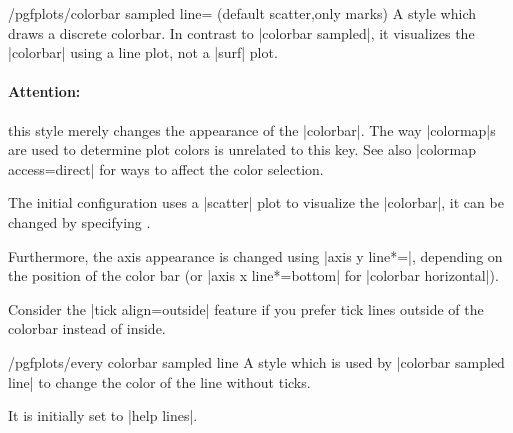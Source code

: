 \begin{stylekey}{/pgfplots/colorbar sampled line= (default scatter,only marks)}
    A style which draws a discrete colorbar. In contrast to |colorbar sampled|,
    it visualizes the |colorbar| using a line plot, not a |surf| plot.
\begin{codeexample}[]
\end{codeexample}

    \paragraph{Attention:}

    this style merely changes the appearance of the |colorbar|. The way
    |colormap|s are used to determine plot colors is unrelated to this key. See
    also |colormap access=direct| for ways to affect the color selection.

    The initial configuration uses a |scatter| plot to visualize the
    |colorbar|, it can be changed by specifying .

    Furthermore, the axis appearance is changed using
    |axis y line*=|, depending on the position of the color
    bar (or |axis x line*=bottom| for |colorbar horizontal|).

    Consider the |tick align=outside| feature if you prefer tick lines outside
    of the colorbar instead of inside.

    \begin{stylekey}{/pgfplots/every colorbar sampled line}
        A style which is used by |colorbar sampled line| to change the color of
        the line without ticks.

        It is initially set to |help lines|.
    \end{stylekey}
\end{stylekey}

